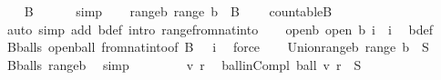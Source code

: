 \begin{isabellebody}
\ \ \isamarkupfalse%
\ {\isachardoublequoteopen}B\ {\isasymunion}\ {\isacharbraceleft}{\kern0pt}{\isacharbraceleft}{\kern0pt}{\isacharbraceright}{\kern0pt}{\isacharbraceright}{\kern0pt}\ {\isasymnoteq}\ {\isacharbraceleft}{\kern0pt}{\isacharbraceright}{\kern0pt}{\isachardoublequoteclose}\ \isamarkupfalse%
\ simp\isanewline
\ \ \isamarkupfalse%
\ range{\isacharunderscore}{\kern0pt}b{\isacharcolon}{\kern0pt}\ {\isachardoublequoteopen}range\ b\ {\isacharequal}{\kern0pt}\ B\ {\isasymunion}\ {\isacharbraceleft}{\kern0pt}{\isacharbraceleft}{\kern0pt}{\isacharbraceright}{\kern0pt}{\isacharbraceright}{\kern0pt}{\isachardoublequoteclose}\ \isamarkupfalse%
\ countable{\isacharunderscore}{\kern0pt}B\ \isamarkupfalse%
\ {\isacharparenleft}{\kern0pt}auto\ simp\ add{\isacharcolon}{\kern0pt}\ b{\isacharunderscore}{\kern0pt}def\ intro{\isacharbang}{\kern0pt}{\isacharcolon}{\kern0pt}\ range{\isacharunderscore}{\kern0pt}from{\isacharunderscore}{\kern0pt}nat{\isacharunderscore}{\kern0pt}into{\isacharparenright}{\kern0pt}\isanewline
\ \ \isamarkupfalse%
\ open{\isacharunderscore}{\kern0pt}b{\isacharcolon}{\kern0pt}\ {\isachardoublequoteopen}open\ {\isacharparenleft}{\kern0pt}b\ i{\isacharparenright}{\kern0pt}{\isachardoublequoteclose}\ \ i\ \isamarkupfalse%
\ b{\isacharunderscore}{\kern0pt}def\ \isamarkupfalse%
\ B{\isacharunderscore}{\kern0pt}balls\ open{\isacharunderscore}{\kern0pt}ball\ from{\isacharunderscore}{\kern0pt}nat{\isacharunderscore}{\kern0pt}into{\isacharbrackleft}{\kern0pt}of\ {\isachardoublequoteopen}B\ {\isasymunion}\ {\isacharbraceleft}{\kern0pt}{\isacharbraceleft}{\kern0pt}{\isacharbraceright}{\kern0pt}{\isacharbraceright}{\kern0pt}{\isachardoublequoteclose}\ i{\isacharbrackright}{\kern0pt}\ \isamarkupfalse%
\ force\isanewline
\ \ \isamarkupfalse%
\ Union{\isacharunderscore}{\kern0pt}range{\isacharunderscore}{\kern0pt}b{\isacharcolon}{\kern0pt}\ {\isachardoublequoteopen}{\isasymUnion}{\isacharparenleft}{\kern0pt}range\ b{\isacharparenright}{\kern0pt}\ {\isacharequal}{\kern0pt}\ {\isacharminus}{\kern0pt}S{\isachardoublequoteclose}\ \isamarkupfalse%
\ B{\isacharunderscore}{\kern0pt}balls\ range{\isacharunderscore}{\kern0pt}b\ \isamarkupfalse%
\ simp\isanewline
\isanewline
\ \ \isacommand{{\isacharbraceleft}{\kern0pt}}\isamarkupfalse%
\isanewline
\ \ \ \ \isamarkupfalse%
\ v\ r\ \isamarkupfalse%
\ ball{\isacharunderscore}{\kern0pt}in{\isacharunderscore}{\kern0pt}Compl{\isacharcolon}{\kern0pt}\ {\isachardoublequoteopen}ball\ v\ r\ {\isasymsubseteq}\ {\isacharminus}{\kern0pt}S{\isachardoublequoteclose}\isanewline

\end{isabellebody}
